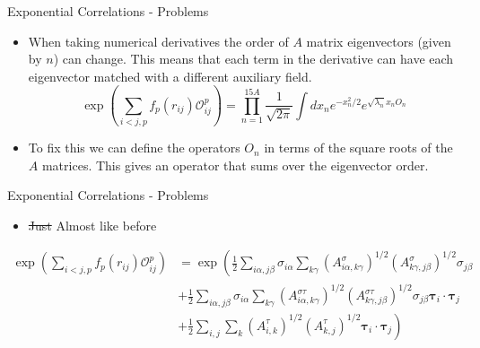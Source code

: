 \documentclass{beamer}
\newcommand{\Opij}{\mathcal{O}_{ij}^p}
\newcommand{\ti}{\bm{\tau}_i}
\newcommand{\tj}{\bm{\tau}_j}
\begin{document}
\begin{frame}{Exponential Correlations - Problems}
\begin{itemize}
   \item When taking numerical derivatives the order of $A$ matrix eigenvectors (given by $n$) can change. This means that each term in the derivative can have each eigenvector matched with a different auxiliary field.
   \begin{equation*}
      \exp\left(\sum\limits_{i<j,p}f_p(r_{ij})\Opij\right) = \prod\limits_{n=1}^{15A} \frac{1}{\sqrt{2\pi}}\int dx_n e^{-x_n^2/2}e^{\sqrt{\lambda_n}x_nO_n}
   \end{equation*}
   \item To fix this we can define the operators $O_n$ in terms of the square roots of the $A$ matrices. This gives an operator that sums over the eigenvector order.
\end{itemize}
\end{frame}

\begin{frame}{Exponential Correlations - Problems}
\begin{itemize}
   \item \st{Just} Almost like before
\end{itemize}
\vspace{0.5cm}
\begin{equation*}
\begin{split}
   \exp\left(\sum\limits_{i<j,p}f_p(r_{ij})\Opij\right) &= \exp\left(\frac{1}{2}\sum\limits_{i\alpha,j\beta} \sigma_{i\alpha}\sum\limits_{k\gamma}\left(A^{\sigma}_{i\alpha,k\gamma}\right)^{1/2}\left(A^{\sigma}_{k\gamma,j\beta}\right)^{1/2}\sigma_{j\beta}\right. \\
      & + \frac{1}{2}\sum\limits_{i\alpha,j\beta} \sigma_{i\alpha}\sum\limits_{k\gamma}\left(A^{\sigma\tau}_{i\alpha,k\gamma}\right)^{1/2}\left(A^{\sigma\tau}_{k\gamma,j\beta}\right)^{1/2}\sigma_{j\beta}\ti\cdot\tj \\
      &\left. + \frac{1}{2}\sum\limits_{i,j} \sum\limits_{k}\left(A^{\tau}_{i,k}\right)^{1/2}\left(A^{\tau}_{k,j}\right)^{1/2}\ti\cdot\tj\right)
\end{split}
\end{equation*}
\end{frame}
\end{document}
